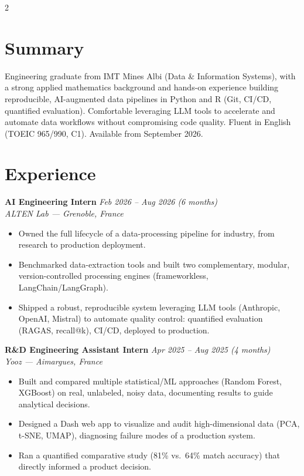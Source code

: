 \documentclass[10.5pt,a4paper]{article}
\newcommand{\sectionrule}{\vspace{-6pt}{\color{accent}\hrule height 1pt}\vspace{7pt}}
\newcommand{\cvexp}[5]{%
  \noindent\textbf{#1} \hfill {\itshape\color{graytext}\small #4}\\
  {\itshape #2 --- #3}\\[-2pt]
  #5
  \vspace{9pt}
}
\begin{document}
\setlength{\columnsep}{1.5em}
\begin{paracol}{2}

\section*{Summary}
\sectionrule
\justifying
Engineering graduate from IMT Mines Albi (Data \& Information Systems), with a strong applied mathematics background and hands-on experience building reproducible, AI-augmented data pipelines in Python and R (Git, CI/CD, quantified evaluation). Comfortable leveraging LLM tools to accelerate and automate data workflows without compromising code quality. Fluent in English (TOEIC 965/990, C1). Available from September 2026.

\section*{Experience}
\sectionrule

\cvexp{AI Engineering Intern}{ALTEN Lab}{Grenoble, France}{Feb 2026 -- Aug 2026 (6 months)}{%
  \begin{itemize}[leftmargin=12pt, itemsep=2pt, topsep=0pt, partopsep=0pt, parsep=0pt]
    \item Owned the full lifecycle of a data-processing pipeline for industry, from research to production deployment.
    \item Benchmarked data-extraction tools and built two complementary, modular, version-controlled processing engines (frameworkless, LangChain/\allowbreak LangGraph).
    \item Shipped a robust, reproducible system leveraging LLM tools (Anthropic, OpenAI, Mistral) to automate quality control: quantified evaluation (RAGAS, recall@k), CI/CD, deployed to production.
  \end{itemize}
}

\cvexp{R\&D Engineering Assistant Intern}{Yooz}{Aimargues, France}{Apr 2025 -- Aug 2025 (4 months)}{%
  \begin{itemize}[leftmargin=12pt, itemsep=2pt, topsep=0pt, partopsep=0pt, parsep=0pt]
    \item Built and compared multiple statistical/ML approaches (Random Forest, XGBoost) on real, unlabeled, noisy data, documenting results to guide analytical decisions.
    \item Designed a Dash web app to visualize and audit high-dimensional data (PCA, t-SNE, UMAP), diagnosing failure modes of a production system.
    \item Ran a quantified comparative study (81\% vs.\ 64\% match accuracy) that directly informed a product decision.
  \end{itemize}
}


\end{paracol}
\end{document}

